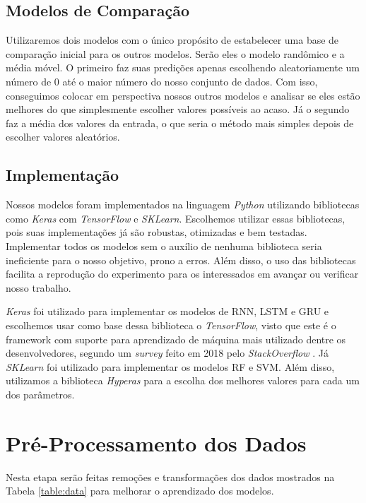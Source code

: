 \subsection{Modelos de Comparação}

Utilizaremos dois modelos com o único propósito de estabelecer uma base de comparação inicial para os outros modelos. Serão eles o modelo randômico e a média móvel. O primeiro faz suas predições apenas escolhendo aleatoriamente um número de 0 até o maior número do nosso conjunto de dados. Com isso, conseguimos colocar em perspectiva nossos outros modelos e analisar se eles estão melhores do que simplesmente escolher valores possíveis ao acaso. Já o segundo faz a média dos valores da entrada, o que seria o método mais simples depois de escolher valores aleatórios.

\subsection{Implementação}

Nossos modelos foram implementados na linguagem \textit{Python} utilizando bibliotecas como \textit{Keras} com \textit{TensorFlow} e \textit{SKLearn}. Escolhemos utilizar essas bibliotecas, pois suas implementações já são robustas, otimizadas e bem testadas. Implementar todos os modelos sem o auxílio de nenhuma biblioteca seria ineficiente para o nosso objetivo,  prono a erros. Além disso, o uso das bibliotecas facilita a reprodução do experimento para os interessados em avançar ou verificar nosso trabalho.

\textit{Keras} foi utilizado para implementar os modelos de \acrshort{RNN}, \acrshort{LSTM} e \acrshort{GRU} e escolhemos usar como base dessa biblioteca o \textit{TensorFlow}, visto que este é o framework com suporte para aprendizado de máquina mais utilizado dentre os desenvolvedores, segundo um \textit{survey} feito em 2018 pelo \textit{StackOverflow} \cite{stack_2018}. Já \textit{SKLearn} foi utilizado para implementar os modelos \acrshort{RF} e \acrshort{SVM}. Além disso, utilizamos a biblioteca \textit {Hyperas} para a escolha dos melhores valores para cada um dos parâmetros.

\section{Pré-Processamento dos Dados}

Nesta etapa serão feitas remoções e transformações dos dados mostrados na Tabela \ref{table:data} para melhorar o aprendizado dos modelos.

